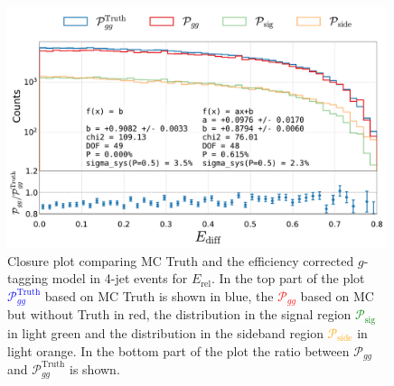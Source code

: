 \begin{figure}
  \centerfloat
  \includegraphics[width=0.99\textwidth, trim=10 0 20 5, clip, page=3]{figures/quarks/gtag-closure_test-down_sample=1.00-ML_vars=vertex-selection=b-ejet_min=4-n_iter_RS_lgb=99-n_iter_RS_xgb=9-cdot_cut=0.90-version=19-njet=4.pdf}
  \caption[Closure Plot Comparing MC Truth and the Efficiency Corrected $g$-Tagging Model in 4-Jet Events for $E_\mathrm{rel}$]
          {Closure plot comparing MC Truth and the efficiency corrected $g$-tagging model in 4-jet events for $E_\mathrm{rel}$. In the top part of the plot \textcolor{blue}{$\mathcal{P}_{gg}^\mathrm{Truth}$} based on MC Truth is shown in blue, the \textcolor{red}{$\mathcal{P}_{gg}$} based on MC but without Truth in red, the distribution in the signal region \textcolor{green}{$\mathcal{P}_{\mathrm{sig}}$} in light green and the distribution in the sideband region \textcolor{orange}{$\mathcal{P}_{\mathrm{side}}$} in light orange. In the bottom part of the plot the ratio between $\mathcal{P}_{gg}$ and $\mathcal{P}_{gg}^\mathrm{Truth}$  is shown. } 
  \label{fig:q:closure_E_rel}
\end{figure}

